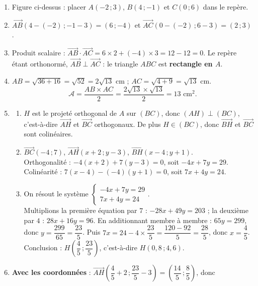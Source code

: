 \documentclass[11pt]{article}
\begin{document}
\begin{corrige}
\begin{enumerate}
\item Figure ci-dessus : placer $A(-2\,;3)$, $B(4\,;-1)$ et $C(0\,;6)$ dans le repère.
\item $\overrightarrow{AB}(4-(-2)\,;-1-3) = (6\,;-4)$ et $\overrightarrow{AC}(0-(-2)\,;6-3) = (2\,;3)$.
\item Produit scalaire : $\overrightarrow{AB}\cdot\overrightarrow{AC} = 6\times 2 + (-4)\times 3 = 12-12 = 0$. Le repère étant orthonormé, $\overrightarrow{AB}\perp\overrightarrow{AC}$ : le triangle $ABC$ est \textbf{rectangle en $A$}.
\item $AB = \sqrt{36+16} = \sqrt{52} = 2\sqrt{13}$ cm ; $AC = \sqrt{4+9} = \sqrt{13}$ cm.
\[ \mathcal{A} = \frac{AB\times AC}{2} = \frac{2\sqrt{13}\times\sqrt{13}}{2} = 13 \text{ cm}^2. \]
\item \begin{enumerate}
\item $H$ est le projeté orthogonal de $A$ sur $(BC)$, donc $(AH)\perp(BC)$, c'est-à-dire $\overrightarrow{AH}$ et $\overrightarrow{BC}$ orthogonaux. De plus $H\in(BC)$, donc $\overrightarrow{BH}$ et $\overrightarrow{BC}$ sont colinéaires.
\item $\overrightarrow{BC}(-4\,;7)$, $\overrightarrow{AH}(x+2\,;y-3)$, $\overrightarrow{BH}(x-4\,;y+1)$.\\
Orthogonalité : $-4(x+2)+7(y-3) = 0$, soit $-4x+7y = 29$.\\
Colinéarité : $7(x-4)-(-4)(y+1) = 0$, soit $7x+4y = 24$.
\item On résout le système $\begin{cases} -4x+7y = 29 \\ 7x+4y = 24 \end{cases}$.\\
Multiplions la première équation par $7$ : $-28x+49y = 203$ ; la deuxième par $4$ : $28x+16y = 96$. En additionnant membre à membre : $65y = 299$, donc $y = \dfrac{299}{65} = \dfrac{23}{5}$. Puis $7x = 24 - 4\times\dfrac{23}{5} = \dfrac{120-92}{5} = \dfrac{28}{5}$, donc $x = \dfrac{4}{5}$.\\
Conclusion : $H\left(\dfrac{4}{5}\,;\dfrac{23}{5}\right)$, c'est-à-dire $H(0,8\,;4,6)$.
\end{enumerate}
\item \textbf{Avec les coordonnées} : $\overrightarrow{AH}\left(\dfrac{4}{5}+2\,;\dfrac{23}{5}-3\right) = \left(\dfrac{14}{5}\,;\dfrac{8}{5}\right)$, donc

\end{enumerate}
\end{corrige}
\end{document}
